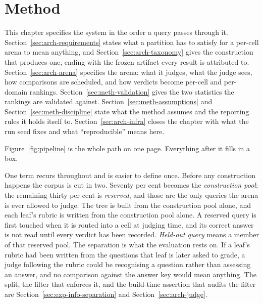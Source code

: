 
\chapter{Method}\label{ch:methodology}

This chapter specifies the system in the order a query passes through
it. Section~\ref{sec:arch-requirements} states what a partition has to
satisfy for a per-cell arena to mean anything, and
Section~\ref{sec:arch-taxonomy} gives the construction that produces
one, ending with the frozen artifact every result is attributed to.
Section~\ref{sec:arch-arena} specifies the arena: what it judges, what
the judge sees, how comparisons are scheduled, and how verdicts become
per-cell and per-domain rankings. Section~\ref{sec:meth-validation}
gives the two statistics the rankings are validated against.
Section~\ref{sec:meth-assumptions} and
Section~\ref{sec:meth-discipline} state what the method assumes and the
reporting rules it holds itself to. Section~\ref{sec:arch-infra} closes
the chapter with what the run seed fixes and what ``reproducible''
means here.

Figure~\ref{fig:pipeline} is the whole path on one page. Everything
after it fills in a box.

One term recurs throughout and is easier to define once. Before any
construction happens the corpus is cut in two. Seventy per cent becomes
the \emph{construction pool}; the remaining thirty per cent is
\emph{reserved}, and those are the only queries the arena is ever
allowed to judge. The tree is built from the construction pool alone,
and each leaf's rubric is written from the construction pool alone. A
reserved query is first touched when it is routed into a cell at
judging time, and its correct answer is not read until every verdict
has been recorded. \emph{Held-out query} means a member of that
reserved pool.
The separation is what the evaluation rests on. If a leaf's rubric had
been written from the questions that leaf is later asked to grade, a
judge following the rubric could be recognising a question rather than
assessing an answer, and no comparison against the answer key would
mean anything. The split, the filter that enforces it, and the
build-time assertion that audits the filter are
Section~\ref{sec:exp-info-separation} and Section~\ref{sec:arch-judge}.

\usetikzlibrary{positioning}

